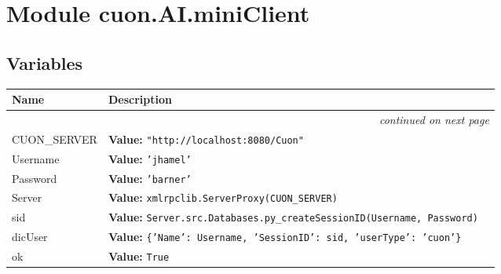 %
%
%


\section{Module cuon.AI.miniClient}

    \label{cuon:AI:miniClient}


  \subsection{Variables}

    \vspace{-1cm}
\hspace{\varindent}\begin{longtable}{|p{\varnamewidth}|p{\vardescrwidth}|l}
\cline{1-2}
\cline{1-2} \centering \textbf{Name} & \centering \textbf{Description}& \\
\cline{1-2}
\endhead\cline{1-2}\multicolumn{3}{r}{\small\textit{continued on next page}}\\\endfoot\cline{1-2}
\endlastfoot\raggedright C\-U\-O\-N\-\_\-S\-E\-R\-V\-E\-R\- & \raggedright \textbf{Value:} 
{\tt "http://localhost:8080/Cuon"}&\\
\cline{1-2}
\raggedright U\-s\-e\-r\-n\-a\-m\-e\- & \raggedright \textbf{Value:} 
{\tt 'jhamel'}&\\
\cline{1-2}
\raggedright P\-a\-s\-s\-w\-o\-r\-d\- & \raggedright \textbf{Value:} 
{\tt 'barner'}&\\
\cline{1-2}
\raggedright S\-e\-r\-v\-e\-r\- & \raggedright \textbf{Value:} 
{\tt xmlrpclib.ServerProxy(CUON\_SERVER)}&\\
\cline{1-2}
\raggedright s\-i\-d\- & \raggedright \textbf{Value:} 
{\tt Server.src.Databases.py\_createSessionID(Username, Password)}&\\
\cline{1-2}
\raggedright d\-i\-c\-U\-s\-e\-r\- & \raggedright \textbf{Value:} 
{\tt \{'Name': Username, 'SessionID': sid, 'userType': 'cuon'\}}&\\
\cline{1-2}
\raggedright o\-k\- & \raggedright \textbf{Value:} 
{\tt True}&\\
\cline{1-2}
\end{longtable}

